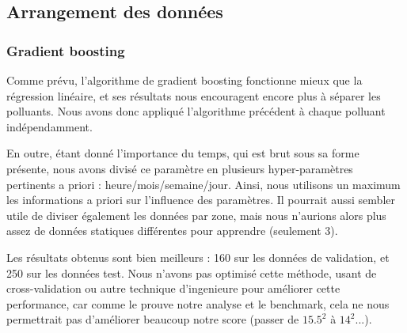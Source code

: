 \subsection{Arrangement des données}

\subsubsection{Gradient boosting}

Comme prévu, l'algorithme de gradient boosting fonctionne mieux que la régression linéaire, et ses résultats nous encouragent encore plus à séparer les polluants. Nous avons donc appliqué l'algorithme précédent à chaque polluant indépendamment. 

En outre, étant donné l'importance du temps, qui est brut sous sa forme présente, nous avons divisé ce paramètre en plusieurs hyper-paramètres pertinents a priori : heure/mois/semaine/jour. Ainsi, nous utilisons un maximum les informations a priori sur l'influence des paramètres. Il pourrait aussi sembler utile de diviser également les données par zone, mais nous n'aurions alors plus assez de données statiques différentes pour apprendre (seulement 3).  

Les résultats obtenus sont bien meilleurs : 160 sur les données de validation, et 250 sur les données test. Nous n'avons pas optimisé cette méthode, usant de cross-validation ou autre technique d'ingenieure pour améliorer cette performance, car comme le prouve notre analyse et le benchmark, cela ne nous permettrait pas d'améliorer beaucoup notre score (passer de $15.5^2$ à $14^2$...).

